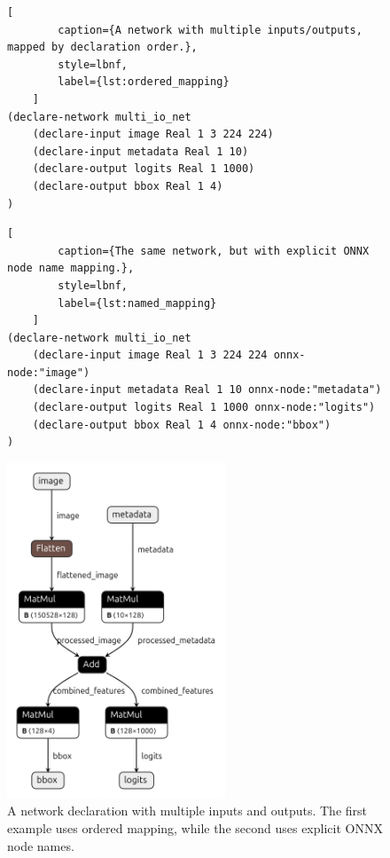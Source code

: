 \begin{figure}[h!]
    \centering
    \begin{lstlisting}[
        caption={A network with multiple inputs/outputs, mapped by declaration order.},
        style=lbnf,
        label={lst:ordered_mapping}
    ]
(declare-network multi_io_net
    (declare-input image Real 1 3 224 224)
    (declare-input metadata Real 1 10)
    (declare-output logits Real 1 1000)
    (declare-output bbox Real 1 4)
)
    \end{lstlisting}
    \begin{lstlisting}[
        caption={The same network, but with explicit ONNX node name mapping.},
        style=lbnf,
        label={lst:named_mapping}
    ]
(declare-network multi_io_net
    (declare-input image Real 1 3 224 224 onnx-node:"image")
    (declare-input metadata Real 1 10 onnx-node:"metadata")
    (declare-output logits Real 1 1000 onnx-node:"logits")
    (declare-output bbox Real 1 4 onnx-node:"bbox")
)
    \end{lstlisting}
    \vspace{0.5cm}
    \includegraphics[height=10cm]{imgs/multi_io_net.onnx.png}
    \caption{A \vnnlib{} network declaration with multiple inputs and outputs. The first example uses ordered mapping, while the second uses explicit ONNX node names.}
    \label{fig:multi_io_net}
\end{figure}



